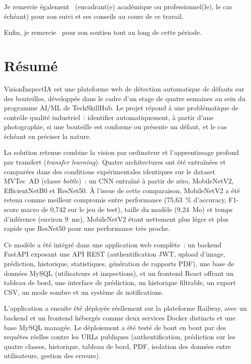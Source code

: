 \documentclass[11pt,a4paper]{report}
\begin{document}
Je remercie \'egalement \encadrant\ (encadrant(e) acad\'emique ou professionnel(le), le cas \'ech\'eant) pour son suivi et ses conseils au cours de ce travail.

Enfin, je remercie \encadrant\ pour son soutien tout au long de cette p\'eriode.

\chapter*{R\'esum\'e}

VisionInspectIA est une plateforme web de d\'etection automatique de d\'efauts sur des bouteilles, d\'evelopp\'ee dans le cadre d'un stage de quatre semaines au sein du programme AI/ML de TechSkillHub. Le projet r\'epond \`a une probl\'ematique de contr\^ole qualit\'e industriel~: identifier automatiquement, \`a partir d'une photographie, si une bouteille est conforme ou pr\'esente un d\'efaut, et le cas \'ech\'eant en pr\'eciser la nature.

La solution retenue combine la vision par ordinateur et l'apprentissage profond par transfert (\emph{transfer learning}). Quatre architectures ont \'et\'e entra\^in\'ees et compar\'ees dans des conditions exp\'erimentales identiques sur le dataset MVTec~AD (classe \emph{bottle})~: un CNN entra\^in\'e \`a partir de z\'ero, MobileNetV2, EfficientNetB0 et ResNet50. \`A l'issue de cette comparaison, MobileNetV2 a \'et\'e retenu comme meilleur compromis entre performance (75,63~\% d'accuracy, F1-score macro de 0,742 sur le jeu de test), taille du mod\`ele (9,24~Mo) et temps d'inf\'erence (environ 9~ms), MobileNetV2 \'etant nettement plus l\'eger et plus rapide que ResNet50 pour une performance tr\`es proche.

Ce mod\`ele a \'et\'e int\'egr\'e dans une application web compl\`ete~: un backend FastAPI exposant une API REST (authentification JWT, upload d'image, pr\'ediction, historique, statistiques, g\'en\'eration de rapports PDF), une base de donn\'ees MySQL (utilisateurs et inspections), et un frontend React offrant un tableau de bord, une interface de pr\'ediction, un historique filtrable, un export CSV, un mode sombre et un syst\`eme de notifications.

L'application a ensuite \'et\'e d\'eploy\'ee r\'eellement sur la plateforme Railway, avec un backend et un frontend h\'eberg\'es comme deux services Docker distincts et une base MySQL manag\'ee. Le d\'eploiement a \'et\'e test\'e de bout en bout par des requ\^etes r\'eelles contre les URLs publiques (authentification, pr\'ediction sur les quatre classes, historique, tableau de bord, PDF, isolation des donn\'ees entre utilisateurs, gestion des erreurs).
\end{document}
